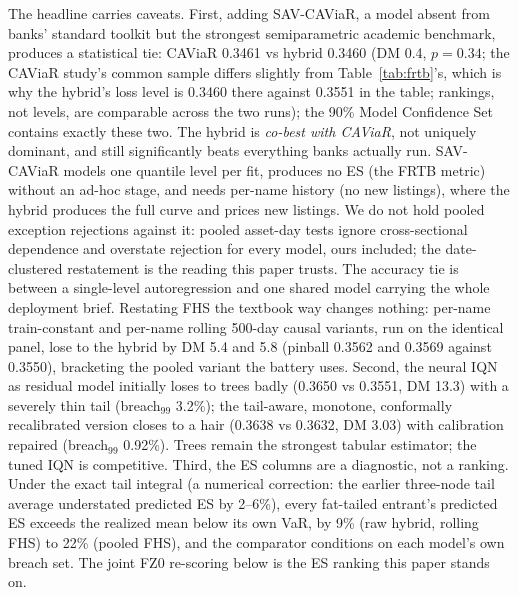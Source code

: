\documentclass[11pt]{article}
\theoremstyle{remark}
\begin{document}
The headline carries caveats. First, adding SAV-CAViaR, a model
absent from banks' standard toolkit
but the strongest semiparametric
academic benchmark, produces a statistical tie: CAViaR 0.3461 vs
hybrid 0.3460 (DM 0.4, $p=0.34$; the CAViaR study's common sample
differs slightly from Table~\ref{tab:frtb}'s, which is why the hybrid's
loss level is 0.3460 there against 0.3551 in the table; rankings, not
levels, are comparable across the two runs); the 90\% Model Confidence
Set contains exactly these two. The hybrid is \emph{co-best with CAViaR},
not uniquely dominant, and still significantly beats everything banks
actually run. SAV-CAViaR models one quantile level per fit, produces
no ES (the FRTB metric) without an ad-hoc stage, and needs per-name
history (no new listings), where the hybrid produces the full curve
and prices new listings. We do not
hold pooled exception rejections against it: pooled asset-day tests
ignore cross-sectional dependence and overstate rejection for every
model, ours included; the date-clustered restatement is the reading
this paper trusts. The accuracy tie is between a
single-level autoregression and one shared model carrying the whole
deployment brief.
Restating FHS the textbook way changes nothing: per-name
train-constant and per-name rolling 500-day causal variants, run on
the identical panel, lose to the hybrid by DM 5.4 and 5.8 (pinball
0.3562 and 0.3569 against 0.3550), bracketing the pooled variant the
battery uses. Second, the neural IQN as residual model initially loses
to trees badly (0.3650 vs 0.3551, DM 13.3) with a severely thin tail
(breach$_{99}$ 3.2\%); the tail-aware, monotone, conformally
recalibrated version closes to a hair (0.3638 vs 0.3632, DM 3.03) with
calibration repaired (breach$_{99}$ 0.92\%). Trees remain the strongest
tabular estimator; the tuned IQN is competitive.
Third, the ES columns are a diagnostic, not a ranking. Under the
exact tail integral (a numerical correction: the earlier three-node
tail average understated predicted ES by 2--6\%),
every fat-tailed entrant's predicted ES exceeds the realized mean
below its own VaR, by 9\% (raw hybrid, rolling FHS) to 22\% (pooled
FHS), and the comparator conditions on each model's own breach set.
The joint FZ0 re-scoring below is the ES ranking this paper stands
on.
\end{document}
